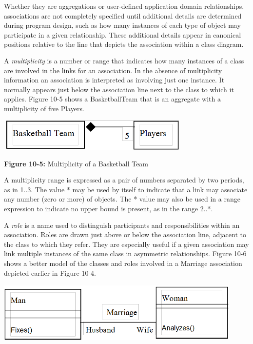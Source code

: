 Whether they are aggregations or user-defined application domain
relationships, associations are not completely specified until
additional details are determined during program design, such as how
many instances of each type of object may participate in a given
relationship. These additional details appear in canonical positions
relative to the line that depicts the association within a class
diagram.

A \textit{multiplicity} is a number or range that
indicates how many instances of a class are involved in the links for
an association. In the absence of multiplicity information an
association is interpreted as involving just one instance. It normally
appears just below the association line next to the class to which it
applies. Figure 10-5 shows a BasketballTeam that is an aggregate with a
multiplicity of five Players.

\begin{center}
\includegraphics[width=3.78in,height=0.63in]{ub-img/multipcy.png}

{\sffamily\bfseries Figure 10-5:}
{\sffamily Multiplicity of a Basketball Team}
\end{center}

A multiplicity range is expressed as a pair of numbers separated by two
periods, as in 1..3. The value * may be used by itself to indicate that
a link may associate any number (zero or more) of objects. The * value
may also be used in a range expression to indicate no upper bound is
present, as in the range 2..*.

A \textit{role} is a name used to distinguish
participants and responsibilities within an association. Roles are
drawn just above or below the association line, adjacent to the class
to which they refer. They are especially useful if a given association
may link multiple instances of the same class in asymmetric
relationships. Figure 10-6 shows a better model of the classes and
roles involved in a Marriage association depicted earlier in Figure
10-4.

\bigskip

\includegraphics[width=4.8in,height=1.2in]{ub-img/roles.png}


